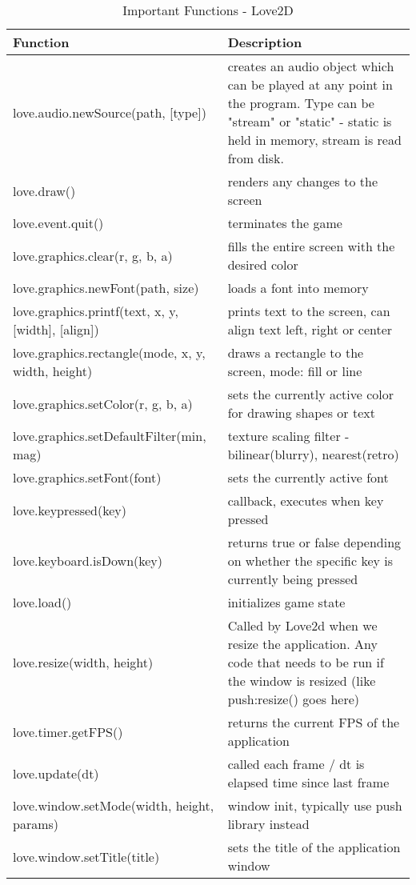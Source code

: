 \begin{table}[h]
\caption{Important Functions - Love2D}
\label{pong-important-functions-love}
\begin{tabular}{p{6cm}p{7.5cm}}
\hline
Function           & Description                                     \\ \hline
love.audio.newSource(path, [type]) & creates an audio object which can be played at any point in the program. Type can be "stream" or "static" - static is held in memory, stream is read from disk. \\
love.draw() & renders any changes to the screen \\
love.event.quit() & terminates the game \\
love.graphics.clear(r, g, b, a) & fills the entire screen with the desired color \\
love.graphics.newFont(path, size) & loads a font into memory \\
love.graphics.printf(text, x, y, [width], [align]) & prints text to the screen, can align text left, right or center \\
love.graphics.rectangle(mode, x, y, width, height) & draws a rectangle to the screen, mode: fill or line \\
love.graphics.setColor(r, g, b, a) & sets the currently active color for drawing shapes or text \\
love.graphics.setDefaultFilter(min, mag) & texture scaling filter - bilinear(blurry), nearest(retro) \\
love.graphics.setFont(font) & sets the currently active font \\
love.keypressed(key) & callback, executes when key pressed \\
love.keyboard.isDown(key) & returns true or false depending on whether the specific key is currently being pressed \\
love.load() & initializes game state            \\ 
love.resize(width, height) & Called by Love2d when we resize the application. Any code that needs to be run if the window is resized (like push:resize() goes here) \\
love.timer.getFPS() & returns the current FPS of the application \\
love.update(dt) & called each frame / dt is elapsed time since last frame \\
love.window.setMode(width, height, params) & window init, typically use push library instead \\
love.window.setTitle(title) & sets the title of the application window \\
\hline
\end{tabular}
\end{table}

